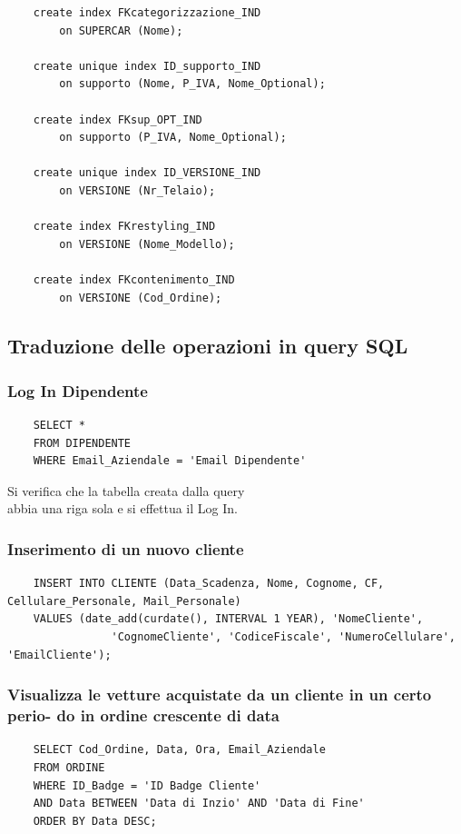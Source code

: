 \documentclass[11pt]{article}
\begin{document}
\begin{lstlisting}
    create index FKcategorizzazione_IND
        on SUPERCAR (Nome);

    create unique index ID_supporto_IND
        on supporto (Nome, P_IVA, Nome_Optional);

    create index FKsup_OPT_IND
        on supporto (P_IVA, Nome_Optional);

    create unique index ID_VERSIONE_IND
        on VERSIONE (Nr_Telaio);

    create index FKrestyling_IND
        on VERSIONE (Nome_Modello);

    create index FKcontenimento_IND
        on VERSIONE (Cod_Ordine);
\end{lstlisting}

\subsection{Traduzione delle operazioni in query SQL}

\subsubsection*{Log In Dipendente}

\begin{lstlisting}
    SELECT * 
    FROM DIPENDENTE 
    WHERE Email_Aziendale = 'Email Dipendente'
\end{lstlisting}
Si verifica che la tabella creata dalla query \\
abbia una riga sola e si effettua il Log In.

\subsubsection*{Inserimento di un nuovo cliente}

\begin{lstlisting}
    INSERT INTO CLIENTE (Data_Scadenza, Nome, Cognome, CF, Cellulare_Personale, Mail_Personale)
    VALUES (date_add(curdate(), INTERVAL 1 YEAR), 'NomeCliente', 
                'CognomeCliente', 'CodiceFiscale', 'NumeroCellulare', 'EmailCliente');
\end{lstlisting}

\subsubsection*{Visualizza le vetture acquistate da un cliente in un certo
perio- do in ordine crescente di data}

\begin{lstlisting}
    SELECT Cod_Ordine, Data, Ora, Email_Aziendale 
    FROM ORDINE
    WHERE ID_Badge = 'ID Badge Cliente' 
    AND Data BETWEEN 'Data di Inzio' AND 'Data di Fine'
    ORDER BY Data DESC;
\end{lstlisting}
\end{document}
